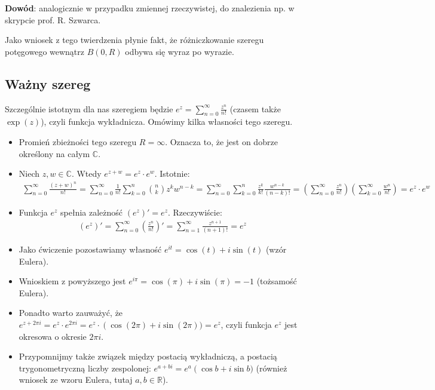 \textbf{Dowód}: analogicznie w przypadku zmiennej rzeczywistej, do znalezienia np. w skrypcie prof. R. Szwarca.

Jako wniosek z tego twierdzenia płynie fakt, że różniczkowanie szeregu potęgowego wewnątrz $B(0,R)$ odbywa się wyraz po wyrazie.

\subsection{Ważny szereg}
Szczególnie istotnym dla nas szeregiem będzie $e^z = \sum_{n=0}^{\infty} \frac{z^n}{n!}$ (czasem także $\exp(z)$), czyli funkcja wykładnicza. Omówimy kilka własności tego szeregu.
\begin{itemize}
	\item Promień zbieżności tego szeregu $R=\infty$. Oznacza to, że jest on dobrze określony na całym $\mathbb{C}$.
	\item Niech $z, w \in \mathbb{C}$. Wtedy $e^{z+w} = e^z \cdot e^w$. Istotnie:
		\begin{align*}
			\sum_{n=0}^{\infty} \frac{(z+w)^n}{n!} = \sum_{n=0}^{\infty} \frac{1}{n!} \sum_{k=0}^{n} \binom{n}{k} z^k w^{n-k} = \sum_{n=0}^{\infty} \sum_{k=0}^{n} \frac{z^k}{k!} \frac{w^{n-k}}{(n-k)!} = \left(\sum_{n=0}^{\infty} \frac{z^n}{n!} \right) \left( \sum_{k=0}^{\infty} \frac{w^n}{n!} \right) = e^z \cdot e^w
		\end{align*}
	\item Funkcja $e^z$ spełnia zależność $\left(e^z\right)' = e^z$. Rzeczywiście:
		\begin{align*}
		\left(e^z\right)' = \sum_{n=0}^{\infty} \left(\frac{z^n}{n!}\right)' = \sum_{n=1}^{\infty} \frac{z^{n+1}}{(n+1)!} = e^z
		\end{align*}
	\item Jako ćwiczenie pozostawiamy własność $e^{it} = \cos(t) + i\sin(t)$ (wzór Eulera).
	\item Wnioskiem z powyższego jest $e^{i\pi} = \cos(\pi) + i\sin(\pi) = -1$ (tożsamość Eulera).
	\item Ponadto warto zauważyć, że $e^{z+2\pi i} = e^z \cdot e^{2\pi i} = e^z \cdot \left(\cos(2\pi) + i\sin(2\pi)) = e^z$, czyli funkcja $e^z$ jest okresowa o okresie $2 \pi i$.
		\item Przypomnijmy także związek między postacią wykładniczą, a postacią trygonometryczną liczby zespolonej: $e^{a+bi} = e^a\left(\cos b + i\sin b)$ (również wniosek ze wzoru Eulera, tutaj $a, b \in \mathbb{R}$).
\end{itemize}
